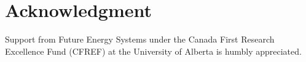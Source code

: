 \documentclass[conference]{IEEEtran}
\begin{document}
\section*{Acknowledgment}
Support from Future Energy Systems under the Canada First Research Excellence Fund (CFREF) at the University of Alberta is humbly appreciated.




\end{document}

